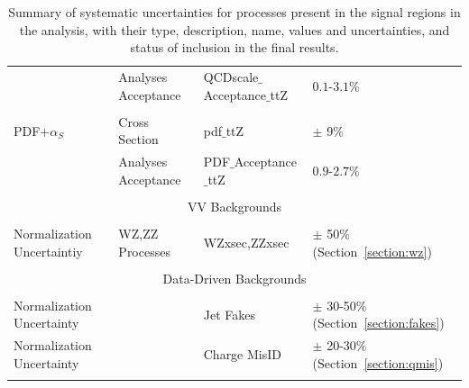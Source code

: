 \begin{table}[htbp]
\begin{center}
{\begin{tabular}{|llll|}
                                            & Analyses Acceptance &    QCDscale$\_$Acceptance$\_$ttZ             &    $0.1$-$3.1\%$          \\
         & &  &               \\
      PDF+$\alpha_S$     &   Cross Section  &    pdf$\_$ttZ         &     $\pm$ 9$\%$       \\
                                      &   Analyses Acceptance  &    PDF$\_$Acceptance$\_$ttZ         &     $0.9$-$2.7\%$      \\
         & &  &               \\
     \hline
      \multicolumn{4}{|c|}{VV Backgrounds}\\
     \hline
         &   & &              \\
      Normalization Uncertaintiy             &   WZ,ZZ Processes       &    WZxsec,ZZxsec        &     $\pm$ 50$\%$   (Section~\ref{section:wz})   \\
          &  &  &             \\
     \hline
      \multicolumn{4}{|c|}{Data-Driven Backgrounds}\\
     \hline
          &  &  &             \\
           Normalization Uncertainty                 &         &    Jet Fakes       &     $\pm$ 30-50$\%$ (Section~\ref{section:fakes})     \\
           Normalization Uncertainty                 &         &    Charge MisID    &     $\pm$ 20-30$\%$ (Section~\ref{section:qmis})      \\
          &  &  &             \\
     \hline
    \end{tabular}
    }
    \caption{ Summary of systematic uncertainties for processes present in the signal regions in the analysis, with their
    type, description, name, values and uncertainties, and status of inclusion in the final results.}
    \label{table:systematics_summary}
    \end{center}
    \end{table} 


